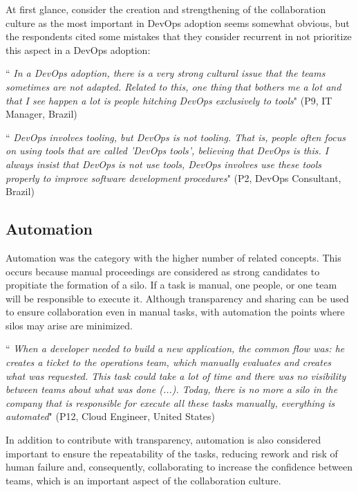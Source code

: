 At first glance, consider the creation and strengthening of the collaboration
culture as the most important in DevOps adoption seems somewhat obvious, but
the respondents cited some mistakes that they consider recurrent in not
prioritize this aspect in a DevOps adoption:

\begin{mq}
``\emph{
In a DevOps adoption, there is a very strong cultural issue that the teams
sometimes are not adapted. Related to this, one thing that bothers me a lot and
that I see happen a lot is people hitching DevOps exclusively to tools}" (P9, IT
Manager, Brazil)
\end{mq}

\begin{mq}
``\emph{
DevOps involves tooling, but DevOps is not tooling. That is, people often
focus on using tools that are called 'DevOps tools', believing that DevOps is
this. I always insist that DevOps is not use tools, DevOps involves use these
tools properly to improve software development procedures}" (P2, DevOps
Consultant, Brazil)
\end{mq}

\subsection{Automation} \label{ssec:automation}
Automation was the category with the higher number of related concepts. This
occurs because manual proceedings are considered as strong candidates to
propitiate the formation of a silo. If a task is manual, one people, or one
team will be responsible to execute it. Although transparency and sharing can
be used to ensure collaboration even in manual tasks, with automation the
points where silos may arise are minimized.

\begin{mq}
``\emph{
When a developer needed to build a new application, the common flow was: he
creates a ticket to the operations team, which manually evaluates and creates
what was requested. This task could take a lot of time and there was no
visibility between teams about what was done (...). Today, there is no more a
silo in the company that is responsible for execute all these tasks manually,
everything is automated}" (P12, Cloud Engineer, United States)
\end{mq}

In addition to contribute with transparency, automation is also considered
important to ensure the repeatability of the tasks, reducing rework and risk of
human failure and, consequently, collaborating to increase the confidence
between teams, which is an important aspect of the collaboration culture.

